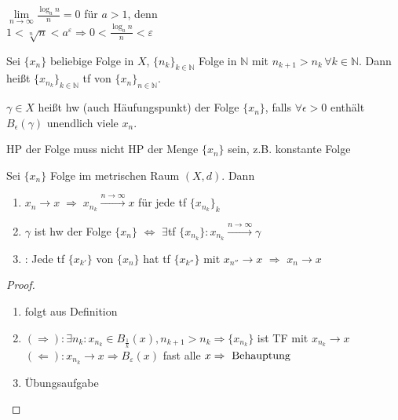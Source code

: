 \begin{example}
	$\lim\limits_{n\to\infty} \frac{\log_a n}{n}=0$ für $a>1$, denn \\
	$1<\sqrt[n]{n}< a^{\varepsilon}\Rightarrow 0 < \frac{\log_a n}{n} < \varepsilon$
\end{example}

\begin{*definition}
	Sei $\{x_n\}$ beliebige Folge in $X$, $\{n_k\}_{k\in\mathbb{N}}$ Folge in $\mathbb{N}$ mit $n_{k+1} > n_k\,\forall k\in\mathbb{N}$. Dann heißt $\{x_{n_k}\}_{k\in\mathbb{N}}$ \gls{tf} von $\{x_n\}_{n\in\mathbb{N}}$.
	
	$\gamma\in X$ heißt \gls{hw} (auch Häufungspunkt) der Folge $\{x_n\}$, falls $\forall \epsilon > 0$ enthält $B_\epsilon(\gamma)$ unendlich viele $x_n$.
	\begin{underlinedenvironment}[beachte]
		HP der Folge muss nicht HP der Menge $\{x_n\}$ sein, z.B. konstante Folge
	\end{underlinedenvironment}
\end{*definition}

\begin{proposition}\label{tfprinzip}
	Sei $\{x_n\}$ Folge im metrischen Raum $(X,d)$. Dann
	\begin{enumerate}[label={\arabic*)}]
		\item $x_n\rightarrow x \;\Rightarrow\; x_{n_k} \overset{n\rightarrow\infty}{\longrightarrow} x$ für jede \gls{tf} $\{x_{n_k}\}_k$
		\item $\gamma$ ist \gls{hw} der Folge $\{x_n\}$ $\Leftrightarrow$ $\exists$\gls{tf} $\{x_{n_k}\}: x_{n_k} \overset{n\rightarrow\infty}{\longrightarrow} \gamma$
		\item {}: Jede \gls{tf} $\{x_{k'}\}$ von $\{x_n\}$ hat \gls{tf} $\{x_{k''}\}$ mit $x_{n''}\rightarrow x$ $\Rightarrow$ $x_n \rightarrow x$
	\end{enumerate}
\end{proposition}
\begin{proof}
	\begin{enumerate}
		\item folgt aus Definition
		\item $(\Rightarrow):\exists n_k:x_{n_k}\in B_{\frac{1}{k}}(x), n_{k+1}>n_k\Rightarrow \{x_{n_k}\}$ ist TF mit $x_{n_k}\to x$ \\
		$(\Leftarrow):x_{n_k}\to x\Rightarrow B_{\varepsilon}(x)$ fast alle $x\Rightarrow \text{ Behauptung}$
		\item Übungsaufgabe
	\end{enumerate}
\end{proof}

